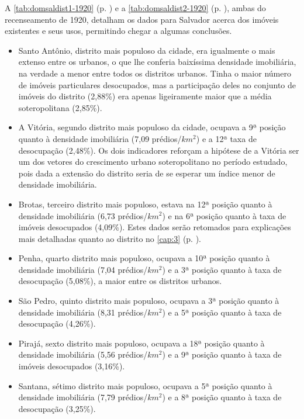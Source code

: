 

A \autoref{tab:domsaldist1-1920} (p. \pageref{tab:domsaldist1-1920}) e a \autoref{tab:domsaldist2-1920} (p. \pageref{tab:domsaldist2-1920}), ambas do recenseamento de 1920, detalham os dados para Salvador acerca dos imóveis existentes e seus usos, permitindo chegar a algumas conclusões.




\begin{itemize}
 \item Santo Antônio, distrito mais populoso da cidade, era igualmente o mais extenso entre os urbanos, o que lhe conferia baixíssima densidade imobiliária, na verdade a menor entre todos os distritos urbanos. Tinha o maior número de imóveis particulares desocupados, mas a participação deles no conjunto de imóveis do distrito (2,88\%) era apenas ligeiramente maior que a média soteropolitana (2,85\%).
 \item A Vitória, segundo distrito mais populoso da cidade, ocupava a 9ª posição quanto à densidade imobiliária (7,09 prédios/$km^{2}$) e a 12ª taxa de desocupação (2,48\%). Os dois indicadores reforçam a hipótese de a Vitória ser um dos vetores do crescimento urbano soteropolitano no período estudado, pois dada a extensão do distrito seria de se esperar um índice menor de densidade imobiliária.
 \item Brotas, terceiro distrito mais populoso, estava na 12ª posição quanto à densidade imobiliária (6,73 prédios/$km^{2}$) e na 6ª posição quanto à taxa de imóveis desocupados (4,09\%). Estes dados serão retomados para explicações mais detalhadas quanto ao distrito no \autoref{cap:3} (p. \pageref{cap:3}).
 \item Penha, quarto distrito mais populoso, ocupava a 10ª posição quanto à densidade imobiliária (7,04 prédios/$km^{2}$) e a 3ª posição quanto à taxa de desocupação (5,08\%), a maior entre os distritos urbanos. 
 \item São Pedro, quinto distrito mais populoso, ocupava a 3ª posição quanto à densidade imobiliária (8,31 prédios/$km^{2}$) e a 5ª posição quanto à taxa de desocupação (4,26\%).
 \item Pirajá, sexto distrito mais populoso, ocupava a 18ª posição quanto à densidade imobiliária (5,56 prédios/$km^{2}$) e a 9ª posição quanto à taxa de imóveis desocupados (3,16\%). 
 \item Santana, sétimo distrito mais populoso, ocupava a 5ª posição quanto à densidade imobiliária (7,79 prédios/$km^{2}$) e a 8ª posição quanto à taxa de desocupação (3,25\%).

\end{itemize}
